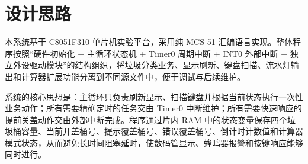 \documentclass[12pt,a4paper]{article}
\begin{document}
\section{设计思路}
本系统基于 C8051F310 单片机实验平台，采用纯 MCS-51 汇编语言实现。整体程序按照“硬件初始化 + 主循环状态机 + Timer0 周期中断 + INT0 外部中断 + 独立外设驱动模块”的结构组织，将垃圾分类业务、显示刷新、键盘扫描、流水灯输出和计算器扩展功能分离到不同源文件中，便于调试与后续维护。

系统的核心思想是：主循环只负责刷新显示、扫描键盘并根据当前状态执行一次性业务动作；所有需要精确定时的任务交由 Timer0 中断维护；所有需要快速响应的提前关盖动作交由外部中断完成。程序通过片内 RAM 中的状态变量保存四个垃圾桶容量、当前开盖桶号、提示覆盖桶号、错误覆盖桶号、倒计时计数值和计算器模式状态，从而避免长时间阻塞延时，使数码管显示、蜂鸣器报警和按键响应能够同时进行。
\end{document}
